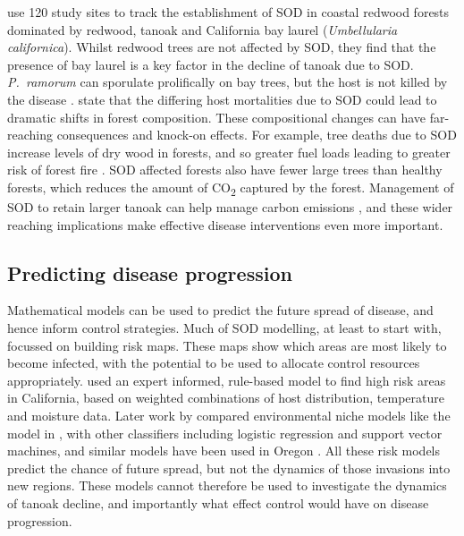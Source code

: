 \citet{maloney_establishment_2005} use 120 study sites to track the establishment of SOD in coastal redwood forests dominated by redwood, tanoak and California bay laurel (\textit{Umbellularia californica}). Whilst redwood trees are not affected by SOD, they find that the presence of bay laurel is a key factor in the decline of tanoak due to SOD\@. \textit{P.~ramorum} can sporulate prolifically on bay trees, but the host is not killed by the disease \citep{davidson_sources_2008}. \citet{maloney_establishment_2005} state that the differing host mortalities due to SOD could lead to dramatic shifts in forest composition. These compositional changes can have far-reaching consequences and knock-on effects. For example, tree deaths due to SOD increase levels of dry wood in forests, and so greater fuel loads leading to greater risk of forest fire \citep{forrestel_disease_2015}. SOD affected forests also have fewer large trees than healthy forests, which reduces the amount of CO\textsubscript{2} captured by the forest. Management of SOD to retain larger tanoak can help manage carbon emissions \citep{twieg_reducing_2017}, and these wider reaching implications make effective disease interventions even more important.

\subsection{Predicting disease progression}

Mathematical models can be used to predict the future spread of disease, and hence inform control strategies. Much of SOD modelling, at least to start with, focussed on building risk maps. These maps show which areas are most likely to become infected, with the potential to be used to allocate control resources appropriately. \citet{meentemeyer_mapping_2004} used an expert informed, rule-based model to find high risk areas in California, based on weighted combinations of host distribution, temperature and moisture data. Later work by \citet{kelly_modeling_2007} compared environmental niche models like the model in \citet{meentemeyer_mapping_2004}, with other classifiers including logistic regression and support vector machines, and similar models have been used in Oregon \citep{vaclavik_mapping_2010}. All these risk models predict the chance of future spread, but not the dynamics of those invasions into new regions. These models cannot therefore be used to investigate the dynamics of tanoak decline, and importantly what effect control would have on disease progression.

